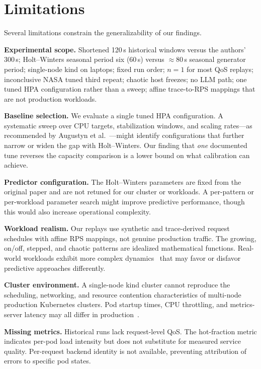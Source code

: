 \documentclass[journal]{IEEEtran}
\begin{document}
\section{Limitations}
Several limitations constrain the generalizability of our findings.

\textbf{Experimental scope.} Shortened 120\,s historical windows versus the authors' 300\,s; Holt--Winters seasonal period six (60\,s) versus $\approx$80\,s seasonal generator period; single-node kind on laptops; fixed run order; $n{=}1$ for most QoS replays; inconclusive NASA tuned third repeat; chaotic host freezes; no LLM path; one tuned HPA configuration rather than a sweep; affine trace-to-RPS mappings that are not production workloads.

\textbf{Baseline selection.} We evaluate a single tuned HPA configuration. A systematic sweep over CPU targets, stabilization windows, and scaling rates---as recommended by Augustyn et al.~\cite{augustyn2024}---might identify configurations that further narrow or widen the gap with Holt--Winters. Our finding that \emph{one} documented tune reverses the capacity comparison is a lower bound on what calibration can achieve.

\textbf{Predictor configuration.} The Holt--Winters parameters are fixed from the original paper and are not retuned for our cluster or workloads. A per-pattern or per-workload parameter search might improve predictive performance, though this would also increase operational complexity.

\textbf{Workload realism.} Our replays use synthetic and trace-derived request schedules with affine RPS mappings, not genuine production traffic. The growing, on/off, stepped, and chaotic patterns are idealized mathematical functions. Real-world workloads exhibit more complex dynamics~\cite{cortez2017, jiang2020} that may favor or disfavor predictive approaches differently.

\textbf{Cluster environment.} A single-node kind cluster cannot reproduce the scheduling, networking, and resource contention characteristics of multi-node production Kubernetes clusters. Pod startup times, CPU throttling, and metrics-server latency may all differ in production~\cite{dogani2023}.

\textbf{Missing metrics.} Historical runs lack request-level QoS. The hot-fraction metric indicates per-pod load intensity but does not substitute for measured service quality. Per-request backend identity is not available, preventing attribution of errors to specific pod states.
\end{document}
